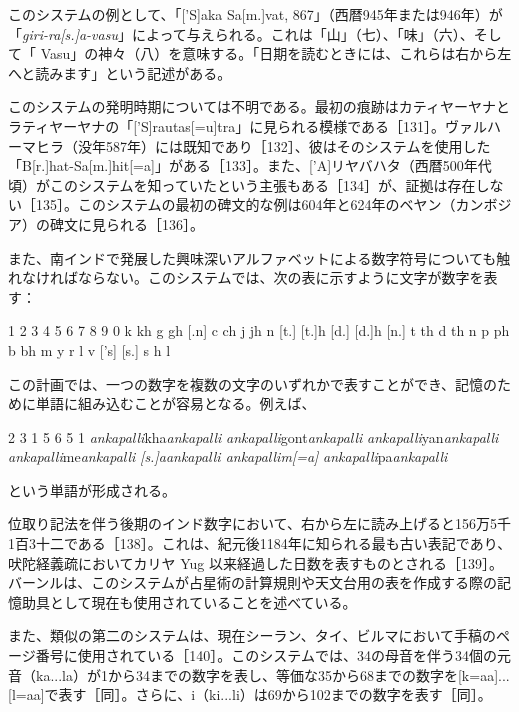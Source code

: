 \documentclass[a4paper,11pt,openany]{ltjsbook}
\begin{document}
このシステムの例として、「['S]aka Sa[m.]vat, 867」（西暦945年または946年）が「\textit{giri-ra[s.]a-vasu}」によって与えられる。これは「山」（七）、「味」（六）、そして「 Vasu」の神々（八）を意味する。「日期を読むときには、これらは右から左へと読みます」という記述がある。

このシステムの発明時期については不明である。最初の痕跡はカティヤーヤナとラティヤーヤナの「['S]rautas[=u]tra」に見られる模様である［131］。ヴァルハーマヒラ（没年587年）には既知であり［132］、彼はそのシステムを使用した「B[r.]hat-Sa[m.]hit[=a]」がある［133］。また、['A]リヤバハタ（西暦500年代頃）がこのシステムを知っていたという主張もある［134］が、証拠は存在しない［135］。このシステムの最初の碑文的な例は604年と624年のベヤン（カンボジア）の碑文に見られる［136］。

また、南インドで発展した興味深いアルファベットによる数字符号についても触れなければならない。このシステムでは、次の表に示すように文字が数字を表す：

1        2       3       4       5        6       7      8     9      0
  k        kh      g       gh      [.n]     c       ch     j     jh     n
  [t.]     [t.]h   [d.]    [d.]h   [n.]     t       th     d     th     n
  p        ph      b       bh      m
  y        r       l       v       ['s]     [s.]    s      h      l

この計画では、一つの数字を複数の文字のいずれかで表すことができ、記憶のために単語に組み込むことが容易となる。例えば、

2     3      1     5    6       5       1
  \textit{ankapalli}kha\textit{ankapalli} \textit{ankapalli}gont\textit{ankapalli} \textit{ankapalli}yan\textit{ankapalli} \textit{ankapalli}me\textit{ankapalli} \textit{[s.]a\textit{ankapalli} \textit{ankapalli}m[=a]} \textit{ankapalli}pa\textit{ankapalli}

という単語が形成される。

位取り記法を伴う後期のインド数字において、右から左に読み上げると156万5千1百3十二である［138］。これは、紀元後1184年に知られる最も古い表記であり、吠陀経義疏においてカリヤ Yug 以来経過した日数を表すものとされる［139］。バーンルは、このシステムが占星術の計算規則や天文台用の表を作成する際の記憶助具として現在も使用されていることを述べている。

また、類似の第二のシステムは、現在シーラン、タイ、ビルマにおいて手稿のページ番号に使用されている［140］。このシステムでは、34の母音を伴う34個の元音（ka...la）が1から34までの数字を表し、等価な35から68までの数字を[k=aa]...[l=aa]で表す［同］。さらに、i（ki...li）は69から102までの数字を表す［同］。
\end{document}
